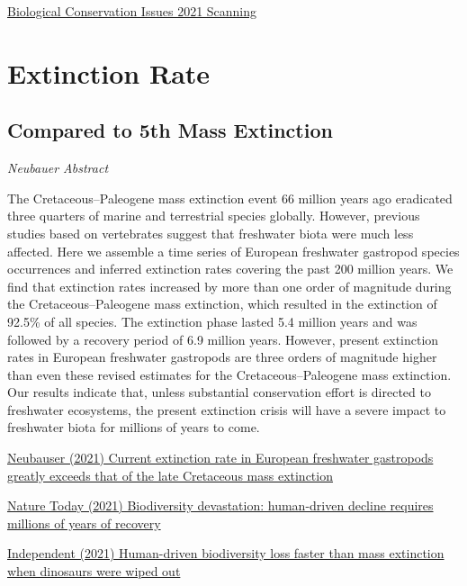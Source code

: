 \documentclass[
]{book}
\begin{document}
\href{https://www.cell.com/trends/ecology-evolution/fulltext/S0169-5347(20)30306-2\#secst0025}{Biological Conservation Issues 2021 Scanning}

\hypertarget{extinction-rate}{%
\section{Extinction Rate}\label{extinction-rate}}

\hypertarget{compared-to-5th-mass-extinction}{%
\subsection{Compared to 5th Mass Extinction}\label{compared-to-5th-mass-extinction}}

\emph{Neubauer Abstract}

The Cretaceous--Paleogene mass extinction event 66 million years ago eradicated three quarters of marine and terrestrial species globally. However, previous studies based on vertebrates suggest that freshwater biota were much less affected. Here we assemble a time series of European freshwater gastropod species occurrences and inferred extinction rates covering the past 200 million years. We find that extinction rates increased by more than one order of magnitude during the Cretaceous--Paleogene mass extinction, which resulted in the extinction of 92.5\% of all species. The extinction phase lasted 5.4 million years and was followed by a recovery period of 6.9 million years. However, present extinction rates in European freshwater gastropods are three orders of magnitude higher than even these revised estimates for the Cretaceous--Paleogene mass extinction. Our results indicate that, unless substantial conservation effort is directed to freshwater ecosystems, the present extinction crisis will have a severe impact to freshwater biota for millions of years to come.

\href{https://www.nature.com/articles/s43247-021-00167-x}{Neubauser (2021) Current extinction rate in European freshwater gastropods greatly exceeds that of the late Cretaceous mass extinction}

\href{https://www.naturetoday.com/intl/en/nature-reports/message/?msg=27702\&utm_source=rssfeed\&utm_medium=rss\&utm_campaign=web-rss-nb}{Nature Today (2021) Biodiversity devastation: human-driven decline requires millions of years of recovery}

\href{https://www.independent.co.uk/independentpremium/mass-extinction-humans-dinosaurs-biodiversity-b1853021.html}{Independent (2021) Human-driven biodiversity loss faster than mass extinction when dinosaurs were wiped out}
\end{document}
